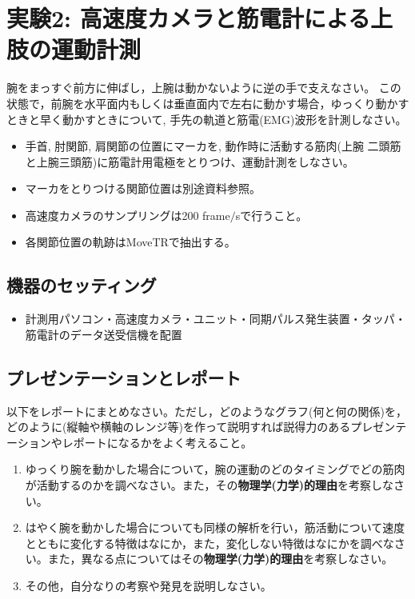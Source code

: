 \documentclass{jsarticle}
\begin{document}
\section{実験2: 高速度カメラと筋電計による上肢の運動計測}

腕をまっすぐ前方に伸ばし，上腕は動かないように逆の手で支えなさい。
この状態で，前腕を水平面内もしくは垂直面内で左右に動かす場合，ゆっくり動かすときと早く動かすときについて, 手先の軌道と筋電(EMG)波形を計測しなさい。

\begin{itemize}
\item 手首, 肘関節, 肩関節の位置にマーカを, 動作時に活動する筋肉(上腕
  二頭筋と上腕三頭筋)に筋電計用電極をとりつけ、運動計測をしなさい。
\item マーカをとりつける関節位置は別途資料参照。
\item 高速度カメラのサンプリングは200 frame$/$sで行うこと。
\item 各関節位置の軌跡はMoveTRで抽出する。
\end{itemize}


\subsection{機器のセッティング}
\begin{itemize}
\item 計測用パソコン・高速度カメラ・ユニット・同期パルス発生装置・タッパ・筋電計のデータ送受信機を配置
\end{itemize}

\subsection{プレゼンテーションとレポート}

以下をレポートにまとめなさい。ただし，どのようなグラフ(何と何の関係)を，どのように(縦軸や横軸のレンジ等)を作って説明すれば説得力のあるプレゼンテーションやレポートになるかをよく考えること。

\begin{enumerate}
	\item ゆっくり腕を動かした場合について，腕の運動のどのタイミングでどの筋肉が活動するのかを調べなさい。また，その\textbf{物理学(力学)的理由}を考察しなさい。
	\item はやく腕を動かした場合についても同様の解析を行い，筋活動について速度とともに変化する特徴はなにか，また，変化しない特徴はなにかを調べなさい。また，異なる点についてはその\textbf{物理学(力学)的理由}を考察しなさい。
  \item その他，自分なりの考察や発見を説明しなさい。
\end{enumerate}
\end{document}
